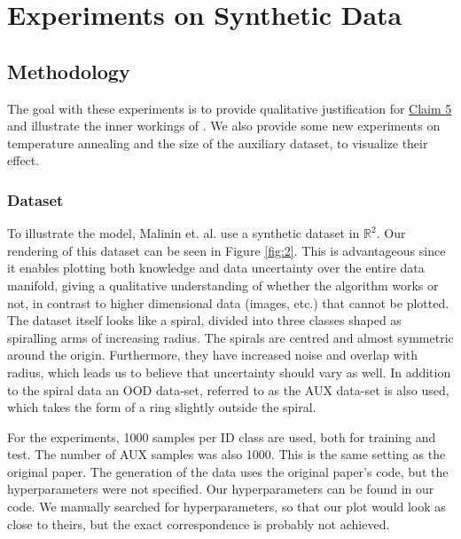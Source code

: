\section{Experiments on Synthetic Data}
\label{sec:experiments-on-synthetic-data}

\subsection{Methodology}

The goal with these experiments is to provide qualitative justification for \hyperlink{claim5}{Claim 5} and illustrate the inner workings of \EnDD. We also provide some new experiments on temperature annealing and the size of the auxiliary dataset, to visualize their effect. 

\subsubsection{Dataset}

To illustrate the model, Malinin et. al. use a synthetic dataset in $\mathbb{R}^2$. Our rendering of this dataset can be seen in Figure \ref{fig:2}. This is advantageous since it enables plotting both knowledge and data uncertainty over the entire data manifold, giving a qualitative understanding of whether the algorithm works or not, in contrast to higher dimensional data (images, etc.) that cannot be plotted. The dataset itself looks like a spiral, divided into three classes shaped as spiralling arms of increasing radius. The spirals are centred and almost symmetric around the origin. Furthermore, they have increased noise and overlap with radius, which leads us to believe that uncertainty should vary as well. In addition to the spiral data an OOD data-set, referred to as the AUX data-set is also used, which takes the form of a ring slightly outside the spiral.

For the experiments, 1000 samples per ID class are used, both for training and test. The number of AUX samples was also 1000. This is the same setting as the original paper. The generation of the data uses the original paper's code, but the hyperparameters were not specified. Our hyperparameters can be found in our code. We manually searched for hyperparameters, so that our plot would look as close to theirs, but the exact correspondence is probably not achieved. 

